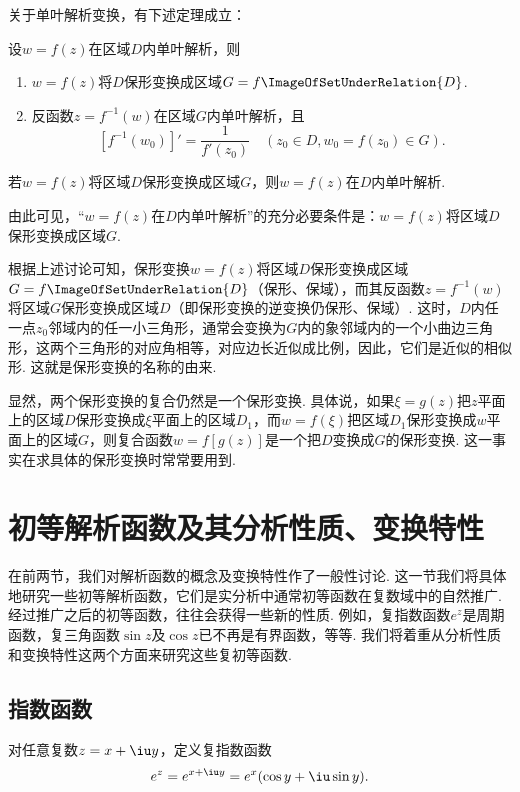 关于单叶解析变换，有下述定理成立：
\begin{theorem}\label{theorem:解析函数.单叶解析变换的性质}
设\(w = f(z)\)在区域\(D\)内单叶解析，则\begin{enumerate}
\item \(w = f(z)\)将\(D\)保形变换成区域\(G = f\ImageOfSetUnderRelation{D}\).
\item 反函数\(z = f^{-1}(w)\)在区域\(G\)内单叶解析，且\[
[ f^{-1}(w_0) ]' = \frac{1}{f'(z_0)}
\quad(z_0 \in D, w_0 = f(z_0) \in G).
\]
\end{enumerate}
\end{theorem}

\begin{theorem}
若\(w = f(z)\)将区域\(D\)保形变换成区域\(G\)，则\(w = f(z)\)在\(D\)内单叶解析.
\end{theorem}
由此可见，“\(w = f(z)\)在\(D\)内单叶解析”的充分必要条件是：\(w = f(z)\)将区域\(D\)保形变换成区域\(G\).

根据上述讨论可知，保形变换\(w = f(z)\)将区域\(D\)保形变换成区域\(G = f\ImageOfSetUnderRelation{D}\)（保形、保域），而其反函数\(z = f^{-1}(w)\)将区域\(G\)保形变换成区域\(D\)（即保形变换的逆变换仍保形、保域）.
这时，\(D\)内任一点\(z_0\)邻域内的任一小三角形，通常会变换为\(G\)内的象邻域内的一个小曲边三角形，这两个三角形的对应角相等，对应边长近似成比例，因此，它们是近似的相似形.
这就是保形变换的名称的由来.

显然，两个保形变换的复合仍然是一个保形变换.
具体说，如果\(\xi = g(z)\)把\(z\)平面上的区域\(D\)保形变换成\(\xi\)平面上的区域\(D_1\)，而\(w = f(\xi)\)把区域\(D_1\)保形变换成\(w\)平面上的区域\(G\)，则复合函数\(w = f[g(z)]\)是一个把\(D\)变换成\(G\)的保形变换.
这一事实在求具体的保形变换时常常要用到.

\section{初等解析函数及其分析性质、变换特性}
在前两节，我们对解析函数的概念及变换特性作了一般性讨论.
这一节我们将具体地研究一些初等解析函数，它们是实分析中通常初等函数在复数域中的自然推广.
经过推广之后的初等函数，往往会获得一些新的性质.
例如，复指数函数\(e^z\)是周期函数，复三角函数\(\sin z\)及\(\cos z\)已不再是有界函数，等等.
我们将着重从分析性质和变换特性这两个方面来研究这些复初等函数.

\subsection{指数函数}
\begin{definition}\label{definition:解析函数.指数函数}
对任意复数\(z=x+\iu y\)，定义复指数函数\begin{equation}
e^z = e^{x+\iu y} = e^x(\cos y + \iu \sin y).
\end{equation}
\end{definition}

